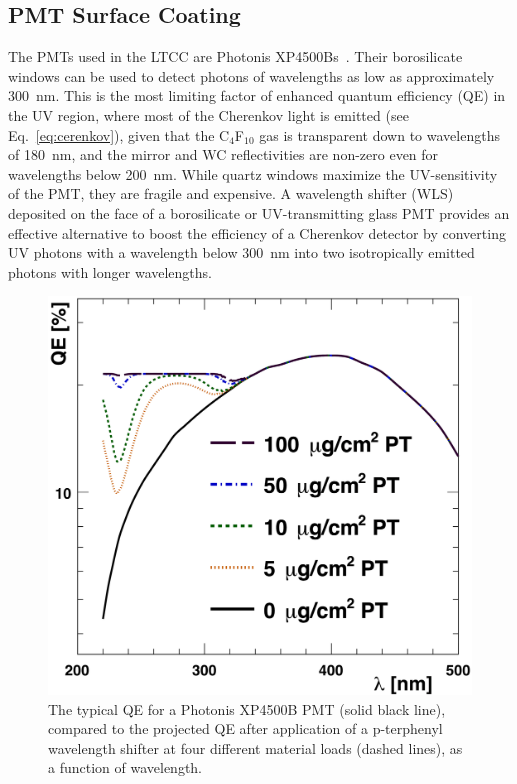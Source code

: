 \subsection{PMT Surface Coating}

The PMTs used in the LTCC are Photonis XP4500Bs~\cite{Photonis:2007ta}. Their borosilicate windows can be used
to detect photons of wavelengths as low as approximately 300~nm. This is the most limiting factor of enhanced
quantum efficiency (QE) in the UV region, where most of the Cherenkov light is emitted (see Eq.~\ref{eq:cerenkov}),
given that the C$_4$F$_{10}$ gas is transparent down to wavelengths of 180~nm, and the mirror and WC reflectivities
are non-zero even for wavelengths below 200~nm. While quartz windows maximize the UV-sensitivity of the PMT, they
are fragile and expensive. A wavelength shifter (WLS) deposited on the face of a borosilicate or UV-transmitting
glass PMT provides an effective alternative to boost the efficiency of a Cherenkov detector by converting UV photons
with a wavelength below 300~nm into two isotropically emitted photons with longer wavelengths.

\begin{figure}[H]
	\centering
	\includegraphics[width=0.99\columnwidth, height=0.75\columnwidth]{img/pmtQuantumEfficiencyGain.png}
	\caption{The typical QE for a Photonis XP4500B PMT (solid black line), compared to the projected QE after
          application of a p-terphenyl wavelength shifter at four different material loads (dashed lines), as a function
          of wavelength.}
	\label{fig:pmtQuantumEfficiencyGainAndExample}
\end{figure}

